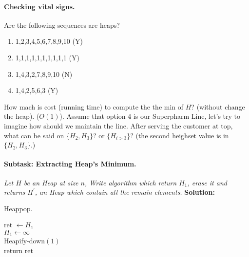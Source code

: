 \paragraph{Checking vital signs.}Are the following sequences are heaps? 
\begin{enumerate}
  \item 1,2,3,4,5,6,7,8,9,10 (Y)
  \item 1,1,1,1,1,1,1,1,1,1  (Y)
  \item 1,4,3,2,7,8,9,10     (N)
  \item 1,4,2,5,6,3	     (Y)
\end{enumerate}
\begin{figure}[h]
  \centering
  \begin{subfigure}[b]{0.3\textwidth}
	
  \end{subfigure}
\begin{subfigure}[b]{0.3\textwidth}
	
  \end{subfigure}
\begin{subfigure}[b]{0.3\textwidth}
	
  \end{subfigure}
\end{figure}
How mach is cost (running time) to compute the the min of $H$? (without change the heap). ($O\left( 1 \right)$). Assume that option 4 is our Superpharm Line, let's try to imagine how should we maintain the line. After serving the customer at top, what can be said on $ \{ H_{2}, H_{3}\}$? or $\{H_{i>3}\}?$ (the second heighset value is in $\{H_{2}, H_{3} \}$.)   

\paragraph{Subtask: Extracting Heap's Minimum.} \textit{Let $H$ be an Heap at size $n$, Write algorithm which return $H_1$, erase it and returns $H^\prime$, an Heap which contain all the remain elements.} 
\textbf{Solution:} 

\begin{algbox}{Heappop.}
\begin{algorithm}[H]
{}
ret $\leftarrow H_{1} $ \\
$ H_{1} \leftarrow \infty $  \\
Heapify-down$\left( 1 \right)$ \\
return ret  
\end{algorithm}
\end{algbox}



